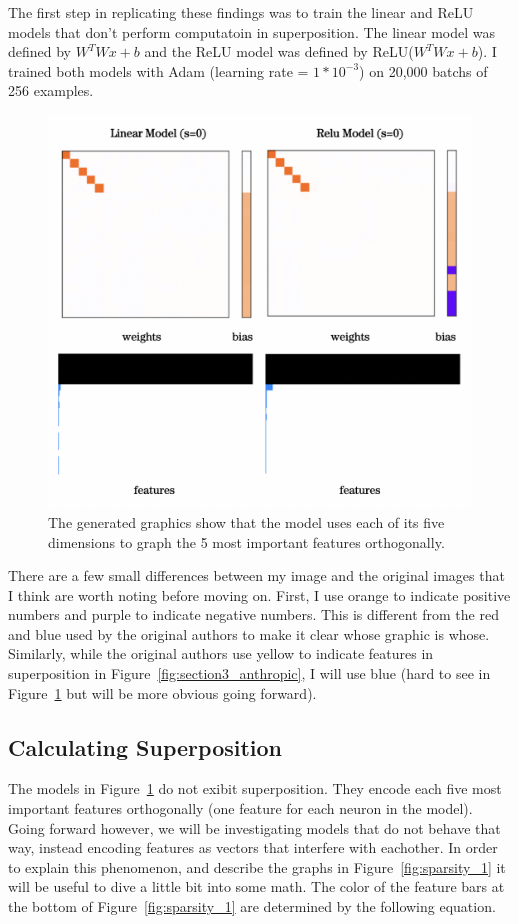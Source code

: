\documentclass{article} %
\begin{document}
The first step in replicating these findings was to train the linear and ReLU
models that don't perform computatoin in superposition. The linear model was
defined by $W^TWx + b$ and the ReLU model was defined by ReLU($W^TWx + b$). I trained both models
with Adam (learning rate = $1*10^{-3}$) on 20,000 batchs of 256 examples.

\begin{figure}[h]
    \centering
    \includegraphics[width=0.5\linewidth]{demonstrating_superposition/images/relu_linear_0_sparsity.png}
    \captionsetup{font=footnotesize, width=0.7\linewidth} %
    \caption{The generated graphics show that the model uses each of its five 
    dimensions to graph the 5 most important features orthogonally.}
    \label{fig:relu_linear_0}
\end{figure}

There are a few small differences between my image and the original images that
I think are worth noting before moving on. First, I use orange to indicate
positive numbers and purple to indicate negative numbers. This is different from
the red and blue used by the original authors to make it clear whose graphic is
whose. Similarly, while the original authors use yellow to indicate features in
superposition in Figure~\ref{fig:section3_anthropic}, I will use blue (hard to
see in Figure~\ref{fig:relu_linear_0} but will be more obvious going forward).

\subsection{Calculating Superposition}

The models in Figure~\ref{fig:relu_linear_0} do not exibit superposition. They
encode each five most important features orthogonally (one feature for each
neuron in the model). Going forward however, we will be investigating models
that do not behave that way, instead encoding features as vectors that interfere
with eachother. In order to explain this phenomenon, and describe the graphs in 
Figure~\ref{fig:sparsity_1} it will be useful to dive a little bit into some
math. The color of the feature bars at the bottom of Figure~\ref{fig:sparsity_1}
are determined by the following equation.
\end{document}

